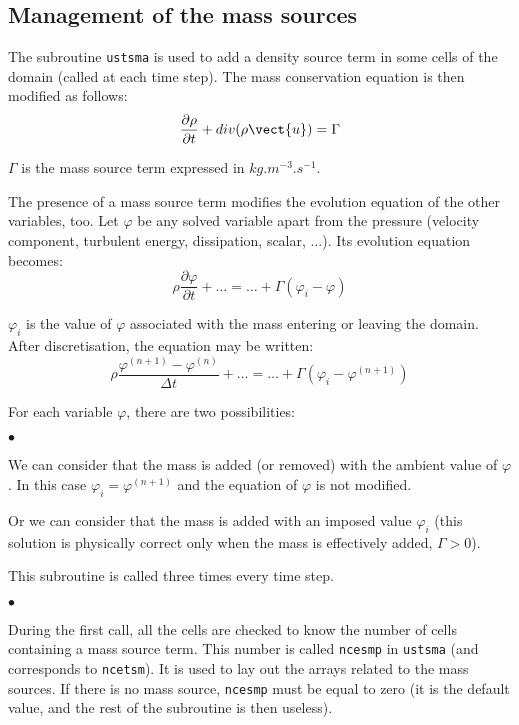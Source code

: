 {{{%
\subsection{Management of the mass sources}

The subroutine \texttt{ustsma} is used to add a density source term in some cells of
the domain (called at each time step). The mass conservation equation is then modified as follows:
\begin{displaymath}
\frac{\partial \rho}{\partial t} + div(\rho\vect{u})=\Gamma
\end{displaymath}

$\Gamma$ is the mass source term expressed in $kg.m^{-3}.s^{-1}$.

The presence of a mass source term modifies the evolution equation of
the other variables, too. Let $\varphi$ be any solved variable apart
from the pressure (velocity component, turbulent energy, dissipation,
scalar, ...). Its evolution equation becomes:
\begin{displaymath}
\rho\frac{\partial \varphi}{\partial t} + \ldots = \ldots + \Gamma(\varphi_i-\varphi)
\end{displaymath}

$\varphi_i$ is the value of $\varphi$ associated with the mass entering
or leaving the domain. After discretisation, the equation may be written:
\begin{displaymath}
\rho\frac{\varphi^{(n+1)}-\varphi^{(n)}}{\Delta t} + \ldots
= \ldots + \Gamma(\varphi_i-\varphi^{(n+1)})
\end{displaymath}

For each variable $\varphi$, there are two possibilities:
\begin{list}{$\bullet$}{}
\item We can consider that the mass is added (or removed) with the
      ambient value of $\varphi$. In this case
      $\varphi_i=\varphi^{(n+1)}$ and the equation of $\varphi$ is not
      modified.
\item Or we can consider that the mass is added with an
      imposed value $\varphi_i$ (this solution is physically correct
      only when the mass is effectively added, $\Gamma>0$).
\end{list}

\bigskip

This subroutine is called three times every time step.

\begin{list}{$\bullet$}{}
\item During the first call, all the cells are checked to know the
      number of cells containing a mass source term.
      This number is called \texttt{ncesmp} in
      \texttt{ustsma} (and corresponds to
      \texttt{ncetsm}). It is used to lay out the arrays
      related to the mass sources. If there is no mass source,
      \texttt{ncesmp} must be equal to zero (it is the default value, and the
      rest of the subroutine is then useless).


\end{list}}}}
